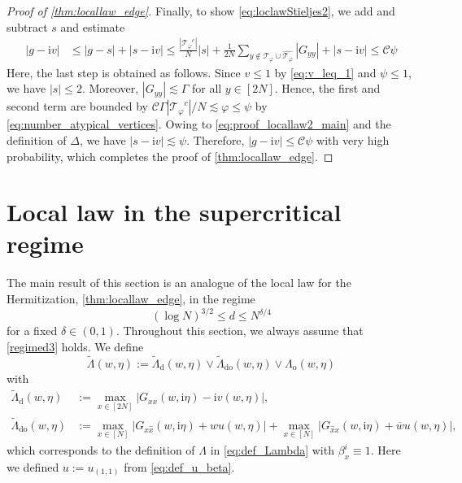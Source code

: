 \documentclass[11pt]{article}
\newcommand{\ii}{\mathrm{i}}
\newcommand{\abs}[1]{\left| #1 \right|}
\theoremstyle{plain}
\theoremstyle{remark}
\numberwithin{equation}{section}
\newcommand*\ubarr[1]{{\widehat{#1}}}
\begin{document}
\begin{proof}[Proof of \cref{thm:locallaw_edge}]
		Finally, to show \cref{eq:loclawStieljes2}, we add and subtract $s$ and estimate 
	\begin{align*}
 \abs{g-\ii v} & \leq \abs{g-s} + \abs{s-\ii v} 
  \leq \frac{\abs{{\mathcal T_{\varphi}}^c}}{N} \abs{s} + \frac{1}{2N} \sum_{y \notin \mathcal T_{\varphi} \cup \widehat{\mathcal T_{\varphi}}}  \abs{G_{yy}}  + \abs{s-\ii v} \leq \mathcal C \psi 
 	\end{align*}
 	Here, the last step is obtained as follows. 
	Since $v\leq 1$ by \cref{eq:v_leq_1} and $\psi \leq 1$, we have $\abs{s} \leq 2$. 
	Moreover, $\abs{G_{yy}} \lesssim \Gamma$ for all $y \in [2N]$. 
	Hence, the first and second term are bounded by $\mathcal C \Gamma \abs{{\mathcal T_{\varphi}}^c}/N \lesssim \varphi \leq \psi$ by \cref{eq:number_atypical_vertices}. 
	Owing to \cref{eq:proof_locallaw2_main} and the definition of $\Delta$, we have $\abs{s-\ii v} \lesssim \psi$. 
		Therefore, $\abs{g-\ii v} \leq \mathcal C \psi$ with very high probability, which completes the proof of \cref{thm:locallaw_edge}.
	\end{proof}
	
	\section{Local law in the supercritical regime}\label{section:loc_law_supercritical}
	
	The main result of this section is an analogue of the local law for the Hermitization, \cref{thm:locallaw_edge}, in the regime 
	\begin{equation}\label{regimed3} 
		( \log N)^{3/2} \le  d \le N^{\delta/4}
	\end{equation}
	for a fixed $\delta \in (0,1)$. Throughout this section, we always assume that \eqref{regimed3} holds. 
	We define  
	\[ \widetilde{\Lambda}(w, \eta) := \widetilde{\Lambda}_\mathrm{d}(w,\eta)  \vee \widetilde{\Lambda}_{\mathrm{do}}(w,\eta) \vee {\Lambda}_{\mathrm{o}}(w,\eta) \] 
	with 
	\begin{align*} 
		\widetilde{\Lambda}_\mathrm{d}(w,\eta) & := \max_{x \in [2N]}\abs{G_{xx}(w,\ii \eta) - \ii v(w, \eta)}, 
		\\ 
		\widetilde{\Lambda}_{\mathrm{do}}(w,\eta)  & := \max_{x \in [N]} \abs{G_{x\ubarr{x}}(w,\ii\eta)+w u(w,\eta)} +   
		\max_{x \in [N]}\abs{G_{\ubarr{x}x}(w,\ii\eta)+ \overline{w} u(w,\eta)},  
	\end{align*} 
	which corresponds to the definition of $\Lambda$ in \cref{eq:def_Lambda} with $\beta_x^i \equiv 1$. Here we defined
	$u := u_{(1,1)}$ from \eqref{eq:def_u_beta}. 
	
\end{document}

